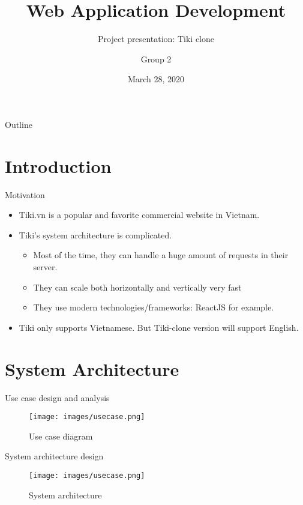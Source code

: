 \documentclass{beamer}
\title[Tiki clone]{Web Application Development}
\author{Group 2}
\subtitle{Project presentation: Tiki clone}
\institute{ICT dept/USTH}
\date{March 28, 2020}
\begin{document}
\begin{frame}
  \titlepage
\end{frame}

\begin{frame}{Outline}
  \tableofcontents
\end{frame}

\section{Introduction}

\begin{frame}{Motivation}
	\begin{itemize}
  		\item Tiki.vn is a popular and favorite commercial website in Vietnam.
  		\item Tiki's system architecture is complicated.
  		\begin{itemize}
			\item Most of the time, they can handle a huge amount of requests in their server.
			\item They can scale both horizontally and vertically very fast
			\item They use modern technologies/frameworks: ReactJS for example.
		\end{itemize}
  		\item Tiki only supports Vietnamese. But Tiki-clone version will support English.
	\end{itemize}
\end{frame}

\section{System Architecture}

\begin{frame}{Use case design and analysis}
\begin{figure}[htp]
    \centering
    \texttt{[image: images/usecase.png]}
    \caption{Use case diagram}
    \label{fig:usecase}
\end{figure}
\end{frame}

\begin{frame}{System architecture design}
\begin{figure}[htp]
    \centering
    \texttt{[image: images/usecase.png]}
    \caption{System architecture}
    \label{fig:sysarch}
\end{figure}
\end{frame}
\end{document}
